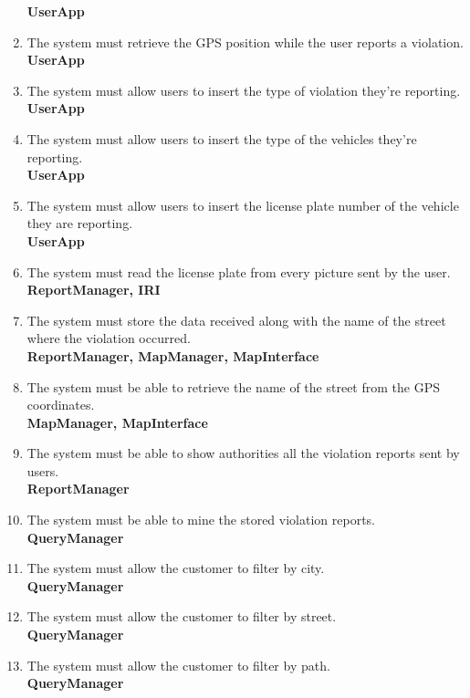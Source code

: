 \begin{enumerate}[label=\textbf{R\arabic*}]
		\textbf{UserApp}
		\item \label{req:gpsPosition} The system must retrieve the GPS position while the user reports a violation.\\
		\textbf{UserApp}
		\item \label{req:violationType} The system must allow users to insert the type of violation they’re reporting.\\
		\textbf{UserApp}
		\item \label{req:vehicleType} The system must allow users to insert the type of the vehicles they’re reporting.\\
		\textbf{UserApp}
		\item \label{req:plateNumber} The system must allow users to insert the license plate number of the vehicle they are reporting.\\
		\textbf{UserApp}
		\item \label{req:readPlate} The system must read the license plate from every picture sent by the user.\\
		\textbf{ReportManager, IRI}
		\item \label{req:storeViolation} The system must store the data received along with the name of the street where the violation occurred.\\
		\textbf{ReportManager, MapManager, MapInterface}
		\item \label{req:streetName} The system must be able to retrieve the name of the street from the GPS coordinates.\\
		\textbf{MapManager, MapInterface}
		\item \label{req:notifyAuthority} The system must be able to show authorities all the violation reports sent by users.\\
		\textbf{ReportManager}
		\item \label{req:mineData} The system must be able to mine the stored violation reports.\\
		\textbf{QueryManager}
		\item \label{req:cityFilter} The system must allow the customer to filter by city.\\
		\textbf{QueryManager}
		\item \label{req:streetFilter} The system must allow the customer to filter by street.\\
		\textbf{QueryManager}
		\item \label{req:pathFilter} The system must allow the customer to filter by path.\\
		\textbf{QueryManager}

\end{enumerate}
